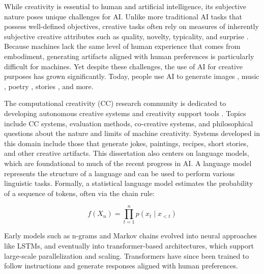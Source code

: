 \documentclass[phd,electronic,oneside,twosidetoc,letterpaper,chaptercenter,parttop,lof]{byumsphd}
\begin{document}
While creativity is essential to human and artificial intelligence, its subjective nature poses unique challenges for AI.
Unlike more traditional AI tasks that possess well-defined objectives, creative tasks often rely on measures of inherently subjective creative attributes such as quality, novelty, typicality, and surprise \cite{ritchie07,pease2011face,jordanous2012standardised,bown2014,lamb2015,ventura2016mere,carnovalini2021,peeperkorn2023}. 
Because machines lack the same level of human experience that comes from embodiment, generating artifacts aligned with human preferences is particularly difficult for machines. 
Yet despite these challenges, the use of AI for creative purposes has grown significantly. 
Today, people use AI to generate images \cite{ho2020denoising}, music \cite{Agostinelli2023MusicLMGM}, poetry \cite{Ormazabal2022PoeLMAM}, stories \cite{Fan2018HierarchicalNS}, and more.

The computational creativity (CC) research community is dedicated to developing autonomous creative systems and creativity support tools \cite{ventura2017howto}.
Topics include CC systems, evaluation methods, co-creative systems, and philosophical questions about the nature and limits of machine creativity.
Systems developed in this domain include those that generate jokes, paintings, recipes, short stories, and other creative artifacts.
This dissertation also centers on language models, which are foundational to much of the recent progress in AI.
A language model represents the structure of a language and can be used to perform various linguistic tasks.
Formally, a statistical language model estimates the probability of a sequence of tokens, often via the chain rule:

\[
f(X_n) = \prod_{t=1}^{n} p(x_t \mid x_{<t})
\]

Early models such as n-grams and Markov chains evolved into neural approaches like LSTMs, and eventually into transformer-based architectures, which support large-scale parallelization and scaling.
Transformers have since been trained to follow instructions and generate responses aligned with human preferences. 
\end{document}
